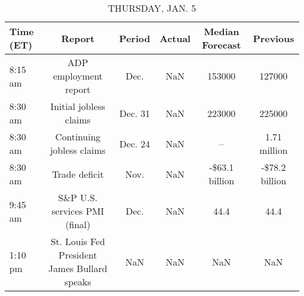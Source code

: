 \documentclass{article}%
\begin{document}
%


\begin{table}[htbp]%
\caption{THURSDAY, JAN. 5}%
\centering%
\begin{adjustbox}{width=1\textwidth}%
\begin{tabular}{lccccc}
\toprule
Time (ET) &                                       Report &  Period & Actual & Median Forecast &       Previous \\
\midrule
  8:15 am &                        ADP employment report &    Dec. &    NaN &          153000 &         127000 \\
  8:30 am &                       Initial jobless claims & Dec. 31 &    NaN &          223000 &         225000 \\
  8:30 am &                    Continuing jobless claims & Dec. 24 &    NaN &              -- &   1.71 million \\
  8:30 am &                                Trade deficit &    Nov. &    NaN &  -\$63.1 billion & -\$78.2 billion \\
  9:45 am &                S\&P U.S. services PMI (final) &    Dec. &    NaN &            44.4 &           44.4 \\
  1:10 pm & St. Louis Fed President James Bullard speaks &     NaN &    NaN &             NaN &            NaN \\
\bottomrule
\end{tabular}
%
\end{adjustbox}%
\end{table}

%
\end{document}
